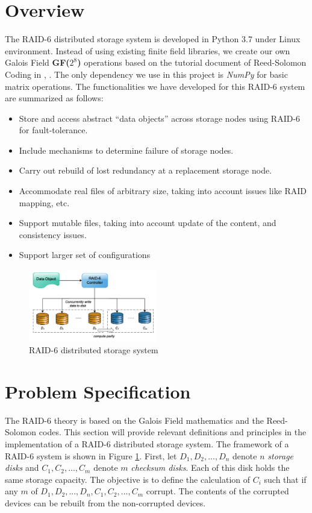 \documentclass[journal]{IEEEtran}
\begin{document}
\section{Overview}
\label{sec2}
The RAID-6 distributed storage system is developed in Python 3.7 under Linux environment. Instead of using existing finite field libraries, we create our own Galois Field \textbf{GF($2^8$)} operations based on the tutorial document of Reed-Solomon Coding in \cite{RAID-6}, \cite{tutorial}. The only dependency we use in this project is \emph{NumPy} for basic matrix operations. The functionalities we have developed for this RAID-6 system are summarized as follows:
\begin{itemize}
	\item Store and access abstract “data objects” across storage nodes using RAID-6 for fault-tolerance.
	\item Include mechanisms to determine failure of storage nodes.
	\item Carry out rebuild of lost redundancy at a replacement storage node.
	\item Accommodate real files of arbitrary size, taking into account issues like RAID mapping, etc. 
	\item Support mutable files, taking into account update of the content, and consistency issues.
	\item Support larger set of configurations
\end{itemize}

\begin{figure}[htbp]

	\centering

	\captionsetup{justification=centering}

	\includegraphics[width=0.5\textwidth]{fig/RAID-6.jpg}

	\caption{RAID-6 distributed storage system}

	\label{fig1}
\end{figure}


\section{Problem Specification}
\label{sec3}
The RAID-6 theory is based on the Galois Field mathematics and the Reed-Solomon codes. This section will provide relevant definitions and principles in the implementation of a RAID-6 distributed storage system. The framework of a RAID-6 system is shown in Figure \ref{fig1}. First, let $D_1, D_2, ... , D_n$ denote $n$ \emph{storage disks} and $C_1, C_2, ... , C_m$ denote $m$ \emph{checksum disks}. Each of this disk holds the same storage capacity. The objective is to define the calculation of $C_i$ such that if any $m$ of $D_1, D_2, ... , D_n, C_1, C_2, ... , C_m$ corrupt. The contents of the corrupted devices can be rebuilt from the non-corrupted devices.
\end{document}
